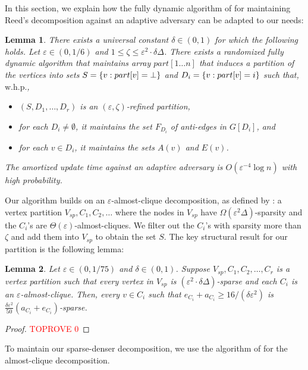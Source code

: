 \documentclass[a4paper,english,11pt]{amsart}
\newtheorem{lemma}{Lemma}[section]
\theoremstyle{definition}
\renewcommand{\leq}{\leqslant}
\renewcommand{\geq}{\geqslant}
\DeclarePairedDelimiter{\set}{\{}{\}}
\newcommand{\eps}{\varepsilon}
\newcommand{\whp}{$\text{w.h.p.}$\xspace}
\newcommand{\Vsparse}{V_{sp}}
\begin{document}
In this section, we explain how the fully dynamic algorithm of \cite{BRW24} for maintaining Reed's decomposition against an adaptive adversary can be adapted to our needs:
\begin{lemma}
    \label{prop:refined-part}
    There exists a universal constant $\delta \in (0,1)$ for which the following holds. Let $\eps \in (0, 1/6)$ and $1 \leq \zeta \leq \eps^2 \cdot \delta \Delta$.
    There exists a randomized fully dynamic algorithm that maintains array $part[1 \ldots n]$ that induces a partition of the vertices into sets $S = \set{ v : part[v] = \bot}$ and $D_i = \set{v :  part[v] = i}$ such that, \whp,
    \begin{itemize}
    \item $(S, D_1, \ldots, D_r)$ is an $(\eps,\zeta)$-refined partition,
\item for each $D_i \neq \emptyset$, it maintains the set $F_{D_i}$ of anti-edges in $G[D_i]$, and
    \item for each $v\in D_i$, it maintains the sets $A(v)$ and $E(v)$.
    \end{itemize}
    The amortized update time against an adaptive adversary is $O(\eps^{-4}\log n)$ with high probability.
\end{lemma}


Our algorithm builds on an $\eps$-almost-clique decomposition, as defined by \cite{ACK19}: a vertex partition $\Vsparse, C_1, C_2, \ldots$
where the nodes in $\Vsparse$ have $\Omega(\eps^2 \Delta)$-sparsity and the $C_i$'s are $\Theta( \eps )$-almost-cliques. We filter out the $C_i$'s with sparsity more than $\zeta$ and add them into $\Vsparse$ to obtain the set $S$.
The key structural result for our partition is the following lemma:



\begin{lemma}
    \label{lem:dense-ext-sparsity}
    Let $\eps \in (0,1/75)$ and $\delta \in (0,1)$.
    Suppose $\Vsparse, C_1, C_2, \ldots, C_r$ is a vertex partition such that every vertex in $\Vsparse$ is $( \eps^2 \cdot \delta\Delta )$-sparse and each $C_i$ is an $\eps$-almost-clique. Then, every $v\in C_i$ such that $e_{C_i} + a_{C_i} \geq 16/(\delta\eps^2)$ is $\frac{\delta \eps^2}{50} ( a_{C_i} + e_{C_i} )$-sparse.
\end{lemma}

\begin{proof}\textcolor{red}{TOPROVE 0}\end{proof}

To maintain our sparse-denser decomposition, we use the algorithm of \cite{BRW24} for the almost-clique decomposition.
\end{document}
